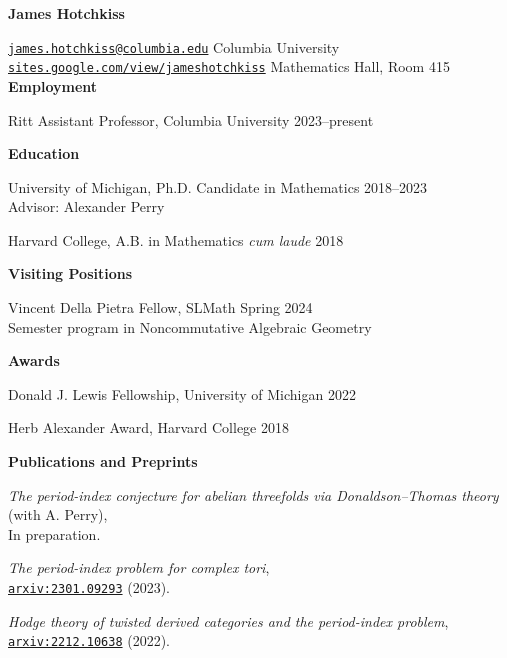 \documentclass[11 pt]{letter}
\begin{document}
	\noindent
	\begin{center}
	 	\textbf{\Large James Hotchkiss}
	 \end{center} 
	\hrulefill 

	\noindent \href{mailto:james.hotchkiss@columbia.edu}{\nolinkurl{james.hotchkiss@columbia.edu}} \hfill Columbia University \\
	\href{https://sites.google.com/view/jameshotchkiss/james-hotchkiss}{\nolinkurl{sites.google.com/view/jameshotchkiss}}  \hfill Mathematics Hall, Room 415 \\



	\noindent
	\textbf{\large{Employment}}

	Ritt Assistant Professor, Columbia University \hfill 2023--present


	\noindent
	\textbf{\large{Education}}

	University of Michigan, Ph.D. Candidate in Mathematics \hfill 2018--2023 \\
	\indent Advisor: Alexander Perry

	Harvard College, A.B. in Mathematics \textit{cum laude} \hfill 2018

	\noindent
	\textbf{\large{Visiting Positions}}

	Vincent Della Pietra Fellow, SLMath \hfill Spring 2024 \\
	\indent Semester program in Noncommutative Algebraic Geometry

	\medskip
	\noindent
	\textbf{\large{Awards}}

	Donald J. Lewis Fellowship, University of Michigan \hfill 2022 

	Herb Alexander Award, Harvard College \hfill 2018


	\medskip
	\noindent
	\textbf{\large{Publications and Preprints}}

	\emph{The period-index conjecture for abelian threefolds via Donaldson--Thomas theory} \\ \indent (with A. Perry), \\
	\indent In preparation. 

	\emph{The period-index problem for complex tori}, \\
	\indent \href{https://arxiv.org/abs/2301.09293}{\nolinkurl{arxiv:2301.09293}} (2023).

	\emph{Hodge theory of twisted derived categories and the period-index problem}, \\ 
	\indent \href{https://arxiv.org/abs/2212.10638}{\nolinkurl{arxiv:2212.10638}} (2022).
\end{document}
